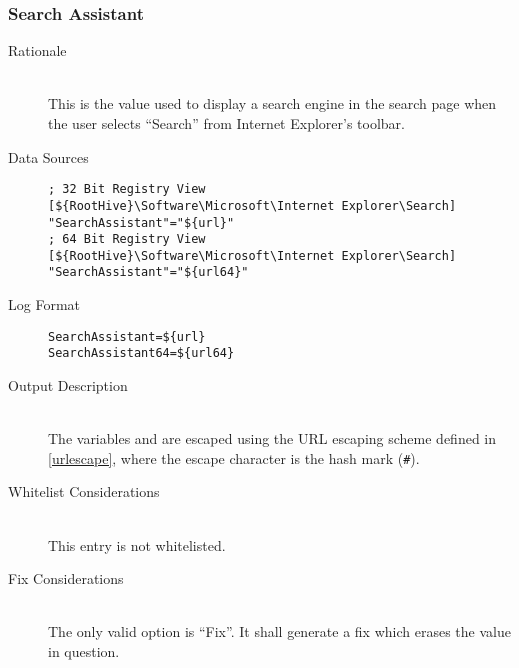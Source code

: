\subsubsection{Search Assistant}
\begin{description}
\item[Rationale] \hfill \\
This is the value used to display a search engine in the search page when the
user selects ``Search'' from Internet Explorer's toolbar.

\item[Data Sources] \hfill
\vspace{-\baselineskip}
\begin{verbatim}
; 32 Bit Registry View
[${RootHive}\Software\Microsoft\Internet Explorer\Search]
"SearchAssistant"="${url}"
; 64 Bit Registry View
[${RootHive}\Software\Microsoft\Internet Explorer\Search]
"SearchAssistant"="${url64}"
\end{verbatim}
\item[Log Format] \hfill
\vspace{-\baselineskip}
\begin{verbatim}
SearchAssistant=${url}
SearchAssistant64=${url64}
\end{verbatim}
\item[Output Description] \hfill \\
The variables  and  are escaped using the URL escaping
scheme defined in \ref{urlescape}, where the escape character is the hash mark
(\verb|#|).
\item[Whitelist Considerations] \hfill \\
This entry is not whitelisted.
\item[Fix Considerations] \hfill \\
The only valid option is ``Fix''. It shall generate a fix which erases the value
in question.
\end{description}

